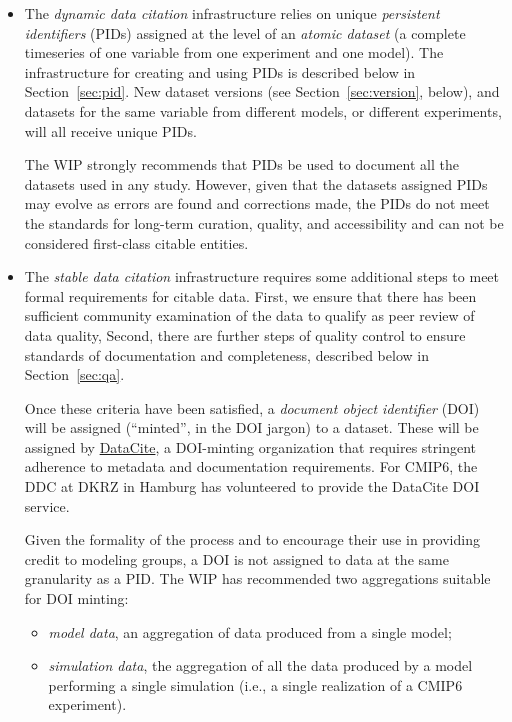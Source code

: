 \documentclass[gmd,manuscript]{copernicus}
\newcommand{\secref}[1] {\mbox{Section  \ref{sec:#1}}}
\begin{document}
\begin{itemize}
\item The \emph{dynamic data citation} infrastructure relies on
unique \emph{persistent identifiers} (PIDs)
  assigned at the level of an \emph{atomic dataset} (a complete
  timeseries of one variable from one experiment and one model). The
  infrastructure for creating and using PIDs is described below in
  \secref{pid}. New dataset versions (see \secref{version}, below),
  and datasets for the same variable from different models, or
  different experiments, will all receive unique PIDs.

  The WIP strongly recommends that PIDs be used to document all the
  datasets used in any study. However, given that the datasets assigned
  PIDs may evolve as errors are found and corrections made, the PIDs
  do not meet the standards for long-term curation, quality, and 
  accessibility and can not be considered first-class citable entities.
\item The \emph{stable data citation} infrastructure requires some
  additional steps to meet formal requirements for citable data. First, we
  ensure that there has been sufficient community examination of the
  data to qualify as peer review of data quality, Second, there are
  further steps of quality control to ensure standards of
  documentation and completeness, described below in \secref{qa}.

  Once these criteria have been satisfied, a \emph{document object
    identifier} (DOI) will be assigned (``minted'', in the DOI jargon)
  to a dataset. These will be assigned by
  \href{https://www.datacite.org/dois.html}{DataCite}, a DOI-minting
  organization that requires stringent adherence to metadata and
  documentation requirements. For CMIP6, the DDC at DKRZ in Hamburg
  has volunteered to provide the DataCite DOI service.

  Given the formality of the process and to encourage their use in
  providing credit to modeling groups, a DOI is not assigned to data at
  the same granularity as a PID. The WIP has recommended two
  aggregations suitable for DOI minting:

  \begin{itemize}
  \item \emph{model data}, an aggregation of data produced from a
    single model;
  \item \emph{simulation data}, the aggregation of all the data
    produced by a model performing a single simulation (i.e., a single
    realization of a CMIP6 experiment).
  \end{itemize}


\end{itemize}
\end{document}

